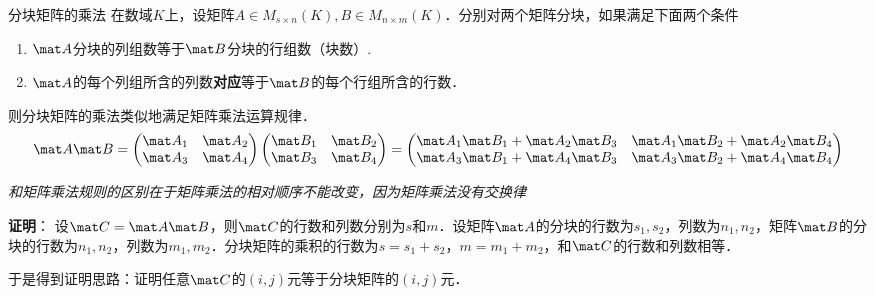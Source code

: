 \begin{theorem}{分块矩阵的乘法}
在数域$K$上，设矩阵$A\in{M_{s\times{n}}(K)},B\in{M_{n\times{m}}(K)}$．分别对两个矩阵分块，如果满足下面两个条件
\begin{enumerate}
\item $\mat A$分块的列组数等于$\mat B$分块的行组数（块数）.
\item $\mat A$的每个列组所含的列数\textbf{对应}等于$\mat B$的每个行组所含的行数．
\end{enumerate}
则分块矩阵的乘法类似地满足矩阵乘法运算规律．
\begin{equation}
\mat A\mat B=
\begin{pmatrix}
\mat A_1 & \mat A_2\\
\mat A_3 & \mat A_4
\end{pmatrix}
\begin{pmatrix}
\mat B_1 & \mat B_2\\
\mat B_3 & \mat B_4
\end{pmatrix}
=
\begin{pmatrix}
\mat A_1\mat B_1+\mat A_2\mat B_3 & \mat A_1\mat B_2+\mat A_2\mat B_4\\
\mat A_3\mat B_1+\mat A_4\mat B_3 & \mat A_3\mat B_2+\mat A_4\mat B_4
\end{pmatrix}
\end{equation}
\end{theorem}
\textsl{和矩阵乘法规则的区别在于矩阵乘法的相对顺序不能改变，因为矩阵乘法没有交换律}

\textbf{证明}：
设$\mat C=\mat A\mat B$，则$\mat C$的行数和列数分别为$s$和$m$．设矩阵$\mat A$的分块的行数为$s_1,s_2$，列数为$n_1,n_2$，矩阵$\mat B$的分块的行数为$n_1,n_2$，列数为$m_1,m_2$．分块矩阵的乘积的行数为$s=s_1+s_2$，$m=m_1+m_2$，和$\mat C$的行数和列数相等．

于是得到证明思路：证明任意$\mat C$的$(i,j)$元等于分块矩阵的$(i,j)$元．



